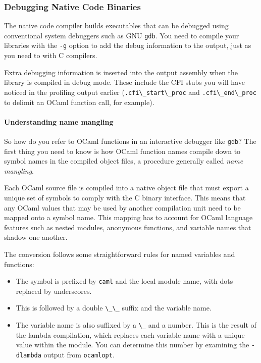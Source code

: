\hypertarget{debugging-native-code-binaries}{%
\subsubsection{Debugging Native Code
Binaries}\label{debugging-native-code-binaries}}

The native code compiler builds executables that can be debugged using
conventional system debuggers such as GNU \passthrough{\lstinline!gdb!}.
You need to compile your libraries with the \passthrough{\lstinline!-g!}
option to add the debug information to the output, just as you need to
with C compilers. 

Extra debugging information is inserted into the output assembly when
the library is compiled in debug mode. These include the CFI stubs you
will have noticed in the profiling output earlier
(\passthrough{\lstinline!.cfi\_start\_proc!} and
\passthrough{\lstinline!.cfi\_end\_proc!} to delimit an OCaml function
call, for example).

\hypertarget{understanding-name-mangling}{%
\paragraph{Understanding name
mangling}\label{understanding-name-mangling}}

So how do you refer to OCaml functions in an interactive debugger like
\passthrough{\lstinline!gdb!}? The first thing you need to know is how
OCaml function names compile down to symbol names in the compiled object
files, a procedure generally called \emph{name
mangling}.

Each OCaml source file is compiled into a native object file that must
export a unique set of symbols to comply with the C binary interface.
This means that any OCaml values that may be used by another compilation
unit need to be mapped onto a symbol name. This mapping has to account
for OCaml language features such as nested modules, anonymous functions,
and variable names that shadow one another.

The conversion follows some straightforward rules for named variables
and functions:

\begin{itemize}
\item
  The symbol is prefixed by \passthrough{\lstinline!caml!} and the local
  module name, with dots replaced by underscores.
\item
  This is followed by a double \passthrough{\lstinline!\_\_!} suffix and
  the variable name.
\item
  The variable name is also suffixed by a \passthrough{\lstinline!\_!}
  and a number. This is the result of the lambda compilation, which
  replaces each variable name with a unique value within the module. You
  can determine this number by examining the
  \passthrough{\lstinline!-dlambda!} output from
  \passthrough{\lstinline!ocamlopt!}.
\end{itemize}

